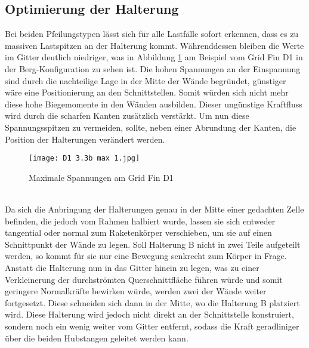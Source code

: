 \subsection{Optimierung der Halterung}
Bei beiden Pfeilungstypen lässt sich für alle Lastfälle sofort erkennen, dass es zu massiven Lastspitzen an der Halterung kommt. Währenddessen bleiben die Werte im Gitter deutlich niedriger, was in Abbildung \ref{abb_V1-D1} am Beispiel vom Grid Fin D1 in der Berg-Konfiguration zu sehen ist. Die hohen Spannungen an der Einspannung sind durch die nachteilige Lage in der Mitte der Wände begründet, günstiger wäre eine Positionierung an den Schnittstellen. Somit würden sich nicht mehr diese hohe Biegemomente in den Wänden ausbilden. Dieser ungünstige Kraftfluss wird durch die scharfen Kanten zusätzlich verstärkt. Um nun diese Spannungsspitzen zu vermeiden, sollte, neben einer Abrundung der Kanten, die Position der Halterungen verändert werden.
\begin{figure}[h] 
	\centering
	\texttt{[image: D1 3.3b max 1.jpg]}
	\caption{Maximale Spannungen am Grid Fin D1}
	\label{abb_V1-D1}
\end{figure}\\
Da sich die Anbringung der Halterungen genau in der Mitte einer gedachten Zelle befinden, die jedoch vom Rahmen halbiert wurde, lassen sie sich entweder tangential oder normal zum Raketenkörper verschieben, um sie auf einen Schnittpunkt der Wände zu legen. Soll Halterung B nicht in zwei Teile aufgeteilt werden, so kommt für sie nur eine Bewegung senkrecht zum Körper in Frage. Anstatt die Halterung nun in das Gitter hinein zu legen, was zu einer Verkleinerung der durchströmten Querschnittfläche führen würde und somit geringere Normalkräfte bewirken würde, werden zwei der Wände weiter fortgesetzt. Diese schneiden sich dann in der Mitte, wo die Halterung B platziert wird. Diese Halterung wird jedoch nicht direkt an der Schnittstelle konstruiert, sondern noch ein wenig weiter vom Gitter entfernt, sodass die Kraft geradliniger über die beiden Hubstangen geleitet werden kann.

